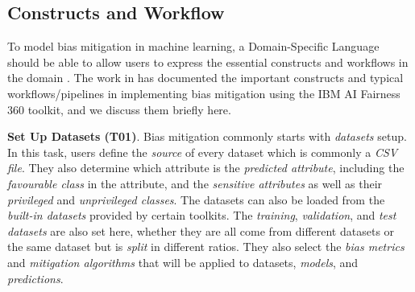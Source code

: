 \documentclass[sigconf]{acmart}
\begin{document}
{		\subsection{Constructs and Workflow}
		\label{sec:constructs_and_workflow}
		
		To model bias mitigation in machine learning, a Domain-Specific Language should be able to allow users to express the essential constructs and workflows in the domain \cite{volter2013model}. The work in \cite{bellamy2018ai} has documented the important constructs and typical workflows/pipelines in implementing bias mitigation using the IBM AI Fairness 360 toolkit, and we discuss them briefly here.
		
		
		\textbf{Set Up Datasets (T01)}. Bias mitigation commonly starts with \textit{datasets} setup. In this task, users define the \textit{source} of every dataset which is commonly a \textit{CSV file}. They also determine which attribute is the \textit{predicted attribute}, including the \textit{favourable class} in the attribute, and the \textit{sensitive attributes} as well as their \textit{privileged} and \textit{unprivileged classes}. The datasets can also be loaded from the \textit{built-in datasets} provided by certain toolkits. 
		The \textit{training}, \textit{validation}, and \textit{test datasets} are also set here, whether they are all come from different datasets or the same dataset but is \textit{split} in different ratios. They also select the \textit{bias metrics} and \textit{mitigation algorithms} that will be applied to datasets, \textit{models}, and \textit{predictions}. 
		
}
\end{document}
